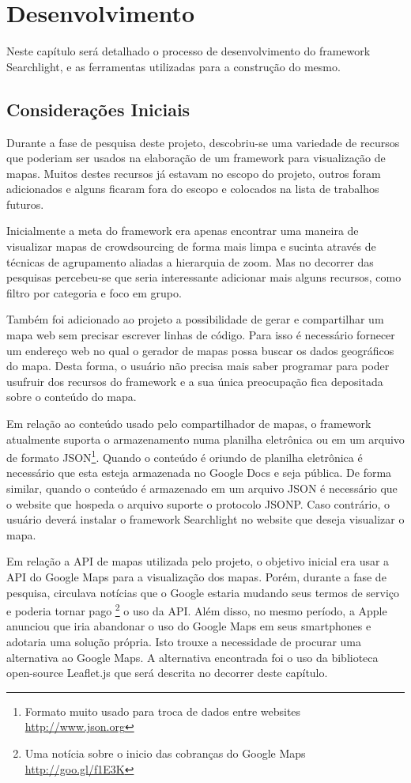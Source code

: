 \chapter{Desenvolvimento}

Neste capítulo será detalhado o processo de desenvolvimento do framework Searchlight, e as ferramentas utilizadas para a construção do mesmo.

\section{Considerações Iniciais}
Durante  a fase de pesquisa deste projeto, descobriu-se uma variedade de recursos que poderiam ser usados na elaboração de um framework para visualização de mapas. Muitos destes recursos já estavam no escopo do projeto, outros foram adicionados  e alguns ficaram fora do escopo e colocados na lista de trabalhos futuros.

Inicialmente a meta do framework era apenas encontrar uma maneira de visualizar mapas de crowdsourcing de forma mais limpa e sucinta através de técnicas de agrupamento aliadas a hierarquia de zoom. Mas no decorrer das pesquisas percebeu-se que seria interessante adicionar mais alguns recursos, como filtro por categoria e foco em grupo. 

Também foi adicionado ao projeto a possibilidade de gerar e compartilhar um mapa web sem precisar escrever linhas de código.
Para isso é necessário fornecer um endereço web no qual o gerador de mapas possa buscar os dados geográficos do mapa. Desta forma, o usuário não precisa mais saber programar para poder usufruir dos recursos do framework e a sua única preocupação fica depositada sobre o conteúdo do mapa.

Em relação ao conteúdo usado pelo compartilhador de mapas, o framework atualmente suporta o armazenamento numa planilha eletrônica ou em um arquivo de formato JSON\footnote{Formato muito usado para troca de dados entre websites \url{http://www.json.org}}. Quando o conteúdo é oriundo de planilha eletrônica é necessário que esta esteja armazenada no Google Docs e seja pública. De forma similar, quando o conteúdo é armazenado em um arquivo JSON é necessário que o website que hospeda o arquivo suporte o protocolo JSONP. Caso contrário, o usuário deverá instalar o framework Searchlight no website que deseja visualizar o mapa.


Em relação a API de mapas utilizada pelo projeto, o objetivo inicial era usar a API do Google Maps para a visualização dos mapas. Porém,  durante a fase de pesquisa, circulava notícias que o Google estaria mudando seus termos de serviço e poderia tornar pago \footnote{Uma notícia sobre o inicio das cobranças do Google Maps \url{http://goo.gl/f1E3K}} o uso da API. Além disso, no mesmo período, a Apple anunciou que iria abandonar o uso do Google Maps em seus smartphones e adotaria uma solução própria. Isto trouxe a necessidade de procurar uma alternativa ao Google Maps. A alternativa encontrada foi o uso da biblioteca open-source Leaflet.js \cite{leaflet} que será descrita no decorrer deste capítulo.

